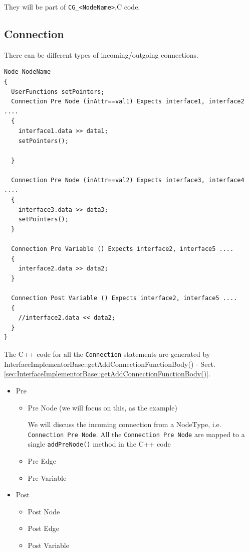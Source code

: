 They will be part of \verb!CG_<NodeName>!.C code.

\subsection{Connection}
\label{sec:Connection-C++-code}

There can be different types of incoming/outgoing connections. 

\begin{verbatim}
Node NodeName 
{
  UserFunctions setPointers;
  Connection Pre Node (inAttr==val1) Expects interface1, interface2 ....
  {
    interface1.data >> data1;
    setPointers();

  }

  Connection Pre Node (inAttr==val2) Expects interface3, interface4 ....
  {
    interface3.data >> data3;
    setPointers();
  }

  Connection Pre Variable () Expects interface2, interface5 ....
  {
    interface2.data >> data2;
  }

  Connection Post Variable () Expects interface2, interface5 ....
  {
    //interface2.data << data2;
  }
}
\end{verbatim}

The C++ code for all the \verb!Connection! statements are generated by
InterfaceImplementorBase::getAddConnectionFunctionBody() -
Sect.\ref{sec:InterfaceImplementorBase::getAddConnectionFunctionBody()}.

\begin{itemize}
  \item Pre
  \begin{itemize}
    \item Pre Node (we will focus on this, as the example)

  We will discuss the incoming connection from a NodeType, i.e.
  \verb!Connection Pre Node!.  All the \verb!Connection Pre Node! are mapped to
  a single \verb!addPreNode()! method in the C++ code
    
    \item Pre Edge
    
    \item Pre Variable
  \end{itemize}
  
  \item Post
  
  \begin{itemize}
    \item Post Node
    
    \item Post Edge
    
    \item Post Variable
  \end{itemize}
  
  
\end{itemize}

